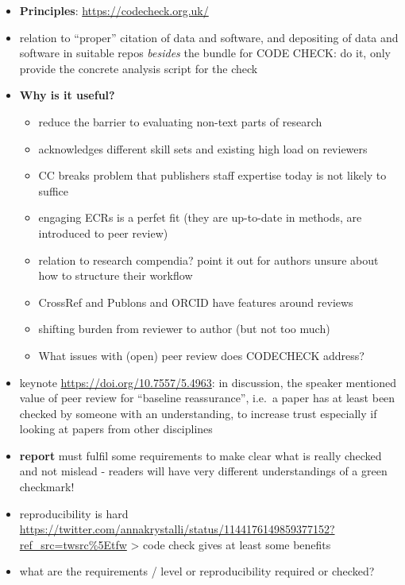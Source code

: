 \documentclass[12pt]{article}
\begin{document}
\begin{itemize}
\item
  \textbf{Principles}: \url{https://codecheck.org.uk/}
\item
  relation to ``proper'' citation of data and software, and depositing
  of data and software in suitable repos \emph{besides} the bundle for
  CODE CHECK: do it, only provide the concrete analysis script for the
  check
\item
  \textbf{Why is it useful?}

  \begin{itemize}
  \item
    reduce the barrier to evaluating non-text parts of research
  \item
    acknowledges different skill sets and existing high load on
    reviewers
  \item
    CC breaks problem that publishers staff expertise today is not
    likely to suffice
  \item
    engaging ECRs is a perfet fit (they are up-to-date in methods, are
    introduced to peer review)
  \item
    relation to research compendia? point it out for authors unsure
    about how to structure their workflow
  \item
    CrossRef and Publons and ORCID have features around reviews
  \item
    shifting burden from reviewer to author (but not too much)
  \item
    What issues with (open) peer review does CODECHECK address?
  \end{itemize}
\item
  keynote \url{https://doi.org/10.7557/5.4963}: in discussion, the
  speaker mentioned value of peer review for ``baseline reassurance'',
  i.e.~a paper has at least been checked by someone with an
  understanding, to increase trust especially if looking at papers from
  other disciplines
\item
  \textbf{report} must fulfil some requirements to make clear what is
  really checked and not mislead - readers will have very different
  understandings of a green checkmark!
\item
  reproducibility is hard
  \url{https://twitter.com/annakrystalli/status/1144176149859377152?ref_src=twsrc\%5Etfw}
  \textgreater{} code check gives at least some benefits
\item
  what are the requirements / level or reproducibility required or
  checked?


\end{itemize}
\end{document}
